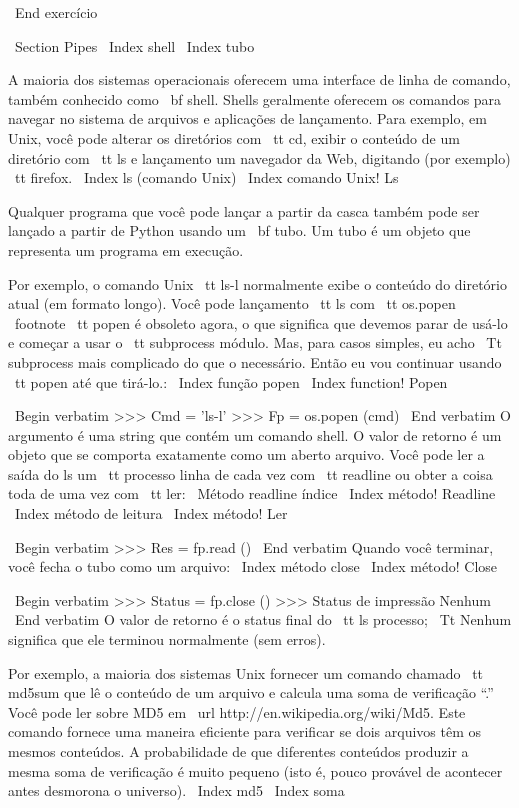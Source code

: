 \documentclass[10pt]{book}
\begin{document}
\begin {itemize}
{{{{{{{{{{\ End {} exercício


\ Section {} Pipes
\ Index {shell}
\ Index {} tubo

A maioria dos sistemas operacionais oferecem uma interface de linha de comando,
também conhecido como {\ bf shell}. Shells geralmente oferecem os comandos
para navegar no sistema de arquivos e aplicações de lançamento. Para
exemplo, em Unix, você pode alterar os diretórios com {\ tt cd},
exibir o conteúdo de um diretório com {\ tt ls} e lançamento
um navegador da Web, digitando (por exemplo) {\ tt firefox}.
\ Index {ls (comando Unix)}
\ Index {comando Unix! Ls}

Qualquer programa que você pode lançar a partir da casca também pode ser
lançado a partir de Python usando um {\ bf tubo}. Um tubo é um objeto
que representa um programa em execução.

Por exemplo, o comando Unix {\ tt ls-l} normalmente exibe o
conteúdo do diretório atual (em formato longo). Você pode
lançamento {\ tt ls} com {\ tt os.popen} \ footnote {{\ tt popen} é obsoleto
agora, o que significa que devemos parar de usá-lo e começar a usar
o {\ tt subprocess} módulo. Mas, para casos simples, eu acho
{\ Tt subprocess} mais complicado do que o necessário. Então eu vou
continuar usando {\ tt popen} até que tirá-lo}.:
\ Index {função popen}
\ Index {function! Popen}

\ Begin {verbatim}
>>> Cmd = 'ls-l'
>>> Fp = os.popen (cmd)
\ End {verbatim}
%
O argumento é uma string que contém um comando shell. O
valor de retorno é um objeto que se comporta exatamente como um aberto
arquivo. Você pode ler a saída do ls um {\ tt} processo
linha de cada vez com {\ tt readline} ou obter a coisa toda de
uma vez com {\ tt ler}:
\ {Método readline} índice
\ Index {método! Readline}
\ Index {método de leitura}
\ Index {método! Ler}

\ Begin {verbatim}
>>> Res = fp.read ()
\ End {verbatim}
%
Quando você terminar, você fecha o tubo como um arquivo:
\ Index {método close}
\ Index {método! Close}

\ Begin {verbatim}
>>> Status = fp.close ()
>>> Status de impressão
Nenhum
\ End {verbatim}
%
O valor de retorno é o status final do {\ tt ls} processo;
{\ Tt Nenhum} significa que ele terminou normalmente (sem erros).

Por exemplo, a maioria dos sistemas Unix fornecer um comando chamado {\ tt md5sum}
que lê o conteúdo de um arquivo e calcula uma soma de verificação ``.''
Você pode ler sobre MD5 em \ url {http://en.wikipedia.org/wiki/Md5}. Este
comando fornece uma maneira eficiente para verificar se dois arquivos
têm os mesmos conteúdos. A probabilidade de que diferentes conteúdos
produzir a mesma soma de verificação é muito pequeno (isto é, pouco provável de acontecer
antes desmorona o universo).
\ Index {md5}
\ Index {soma}

}}}}}}}}}}
\end{itemize}
\end{document}
